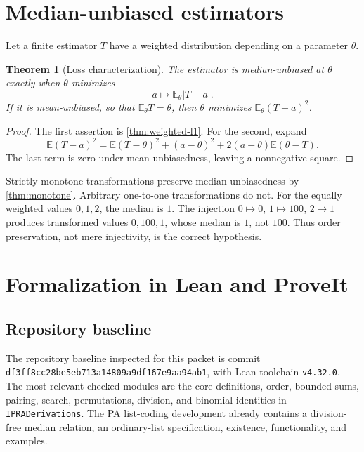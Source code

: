 \documentclass[11pt]{article}
\newtheorem{theorem}{Theorem}[section]
\newcommand{\abs}[1]{\left|#1\right|}
\begin{document}
\section{Median-unbiased estimators}

Let a finite estimator $T$ have a weighted distribution depending on a
parameter $\theta$.

\begin{theorem}[Loss characterization]
The estimator is median-unbiased at $\theta$ exactly when $\theta$ minimizes
\[
 a\longmapsto \mathbb E_\theta\abs{T-a}.
\]
If it is mean-unbiased, so that $\mathbb E_\theta T=\theta$, then $\theta$
minimizes $\mathbb E_\theta(T-a)^2$.
\end{theorem}

\begin{proof}
The first assertion is \cref{thm:weighted-l1}.  For the second, expand
\[
 \mathbb E(T-a)^2
 =\mathbb E(T-\theta)^2+(a-\theta)^2
 +2(a-\theta)\mathbb E(\theta-T).
\]
The last term is zero under mean-unbiasedness, leaving a nonnegative square.
\end{proof}

Strictly monotone transformations preserve median-unbiasedness by
\cref{thm:monotone}.  Arbitrary one-to-one transformations do not.  For the
equally weighted values $0,1,2$, the median is $1$.  The injection
$0\mapsto0$, $1\mapsto100$, $2\mapsto1$ produces transformed values
$0,100,1$, whose median is $1$, not $100$.  Thus order preservation, not mere
injectivity, is the correct hypothesis.

\section{Formalization in Lean and ProveIt}

\subsection{Repository baseline}

The repository baseline inspected for this packet is commit
\texttt{df3ff8cc28be5eb713a14809a9df167e9aa94ab1}, with Lean toolchain
\texttt{v4.32.0}.  The most relevant checked modules are the core definitions,
order, bounded sums, pairing, search, permutations, division, and binomial
identities in \texttt{IPRADerivations}.  The PA list-coding development already
contains a division-free median relation, an ordinary-list specification,
existence, functionality, and examples.
\end{document}
